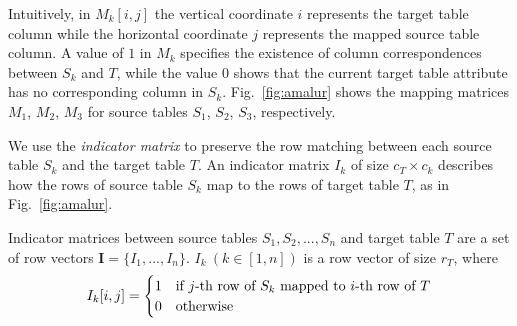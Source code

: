 \vspace{-2mm}
Intuitively, in $M_k[i,j]$ the vertical coordinate $i$ represents the target table column while the horizontal coordinate $j$ represents the mapped source table column.  A value of $1$ in $M_k$ specifies the existence of  column correspondences between  $S_k$ and $T$, while the value $0$ shows that the current target table attribute has no corresponding column in $S_k$. Fig.~\ref{fig:amalur} shows the mapping matrices $M_1$, $M_2$, $M_3$ for source tables $S_1$, $S_2$, $S_3$, respectively. 
 





We use the \emph{indicator matrix} \cite{chen2017towards} 
to preserve the row matching between each source table $S_k$ and the target table $T$. 
An indicator matrix $I_k$ of size $c_T \times c_{k}$ describes how the rows of source table $S_k$ map to the rows of target table $T$, as in Fig.~\ref{fig:amalur}. 
 
\begin{definition} Indicator matrices between source tables $S_1, S_2, ..., S_n$ and target table $T$ are a set of row vectors $\mathbf{I}= \{I_1, ..., I_n\}$. $I_k \ (k\in [1, n])$ is a row vector  of size $r_{T}$, where 
\small{
		\begin{align*}
			\begin{split} 
					I_k[i,j] =  \begin{cases}
$1$ & \text{if $j$-th row of $S_k$ mapped to $i$-th row of $T$} \\
$0$ & \text{otherwise}
\end{cases}
			\end{split}
		\end{align*}
	\label{def:cim}
}
\end{definition}
 

